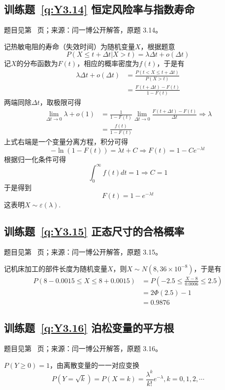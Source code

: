 \subsection*{训练题~\ref{q:Y3.14} 恒定风险率与指数寿命}\label{a:Y3.14}{\small 题目见第~\pageref{q:Y3.14} 页；来源：闫一博公开解答，原题 3.14。}
\begin{solve}
记热敏电阻的寿命（失效时间）为随机变量$X$，根据题意
\[P(X \leqslant t + \Delta t|X > t) = \lambda \Delta t + o(\Delta t)\]
记$X$的分布函数为$F(t)$，相应的概率密度为$f(t)$，于是有
\[\begin{aligned}\lambda \Delta t + o(\Delta t) &= \frac{{P(t < X \leqslant t + \Delta t)}}{{P(X > t)}} \\&= \frac{{F(t + \Delta t) - F(t)}}{{1 - F(t)}}\end{aligned}\]
两端同除$\Delta t$，取极限可得
\[\begin{aligned}\mathop {\lim }\limits_{\Delta t \to 0} \lambda  + o(1) &= \frac{1}{{1 - F(t)}}\mathop {\lim }\limits_{\Delta t \to 0} \frac{{F(t + \Delta t) - F(t)}}{{\Delta t}} \Rightarrow \lambda  \\&= \frac{{f(t)}}{{1 - F(t)}}\end{aligned}\]
上式右端是一个变量分离方程，积分可得
\[ - \ln (1 - F(t)) = \lambda t + C \Rightarrow F(t) = 1 - C{e^{ - \lambda t}}\]
根据归一化条件可得
\[\int_0^\infty  {f(t)dt}  = 1 \Rightarrow C = 1\]
于是得到
\[F(t) = 1 - {e^{ - \lambda t}}\]
这表明$X\sim \varepsilon(\lambda)$.
\end{solve}

\subsection*{训练题~\ref{q:Y3.15} 正态尺寸的合格概率}\label{a:Y3.15}{\small 题目见第~\pageref{q:Y3.15} 页；来源：闫一博公开解答，原题 3.15。}
\begin{solve}
记机床加工的部件长度为随机变量$X$，则$X\sim N(8,36\times 10^{-8})$，于是有
\[\begin{aligned}P(8 - 0.0015 \leqslant X \leqslant 8 + 0.0015) &= P( - 2.5 \leqslant \frac{{X - 8}}{{0.0006}} \leqslant 2.5) \\&= 2\Phi (2.5) - 1 \\&= 0.9876\end{aligned}\]
\end{solve}

\subsection*{训练题~\ref{q:Y3.16} 泊松变量的平方根}\label{a:Y3.16}{\small 题目见第~\pageref{q:Y3.16} 页；来源：闫一博公开解答，原题 3.16。}
\begin{solve}
$P(Y\geqslant 0)=1$，由离散变量的一一对应变换
\[P(Y = \sqrt k ) = P(X = k) = \frac{{{\lambda ^k}}}{{k!}}{e^{ - \lambda }},k = 0,1,2, \cdots \]
\end{solve}

